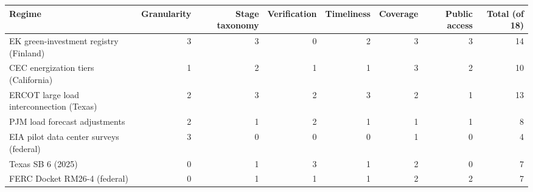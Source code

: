\begin{tabular}{lrrrrrrr}
\toprule
Regime & Granularity & Stage taxonomy & Verification & Timeliness & Coverage & Public access & Total (of 18) \\
\midrule
EK green-investment registry (Finland) & 3 & 3 & 0 & 2 & 3 & 3 & 14 \\
CEC energization tiers (California) & 1 & 2 & 1 & 1 & 3 & 2 & 10 \\
ERCOT large load interconnection (Texas) & 2 & 3 & 2 & 3 & 2 & 1 & 13 \\
PJM load forecast adjustments & 2 & 1 & 2 & 1 & 1 & 1 & 8 \\
EIA pilot data center surveys (federal) & 3 & 0 & 0 & 0 & 1 & 0 & 4 \\
Texas SB 6 (2025) & 0 & 1 & 3 & 1 & 2 & 0 & 7 \\
FERC Docket RM26-4 (federal) & 0 & 1 & 1 & 1 & 2 & 2 & 7 \\
\bottomrule
\end{tabular}
